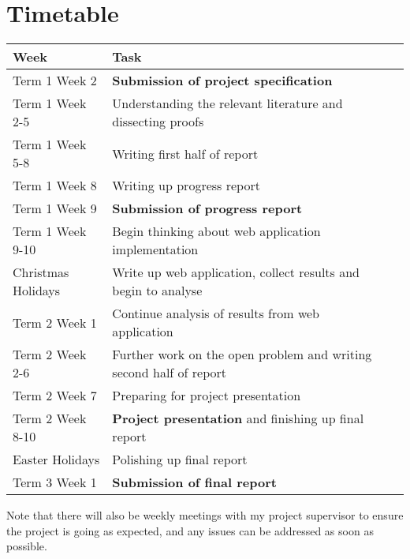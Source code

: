 \documentclass[a4paper]{article}
\begin{document}
\section{Timetable}
	\begin{tabularx}{\textwidth}{|l|X|Xr}
		\hline
		\textbf{Week} & \textbf{Task} \\
		\hline
		Term 1 Week 2 & \textbf{Submission of project specification} \\
		\hline
		Term 1 Week 2-5 & Understanding the relevant literature and dissecting proofs \\
		\hline
		Term 1 Week 5-8 & Writing first half of report \\
		\hline
		Term 1 Week 8 & Writing up progress report \\
		\hline
		Term 1 Week 9 & \textbf{Submission of progress report} \\ 
		\hline
		Term 1 Week 9-10 & Begin thinking about web application implementation \\ 
		\hline
		Christmas Holidays & Write up web application, collect results and begin to analyse \\
		\hline
		Term 2 Week 1 & Continue analysis of results from web application  \\
		\hline
		Term 2 Week 2-6 & Further work on the open problem and writing second half of report \\
		\hline
		Term 2 Week 7 & Preparing for project presentation \\
		\hline
		Term 2 Week 8-10 & \textbf{Project presentation} and finishing up final report \\ 
		\hline
		Easter Holidays & Polishing up final report \\ 
		\hline
		Term 3 Week 1 & \textbf{Submission of final report} \\
		\hline
	\end{tabularx}
\newline 
\newline
Note that there will also be weekly meetings with my project supervisor to ensure the project is going as expected, and any issues can be addressed as soon as possible.
\end{document}
